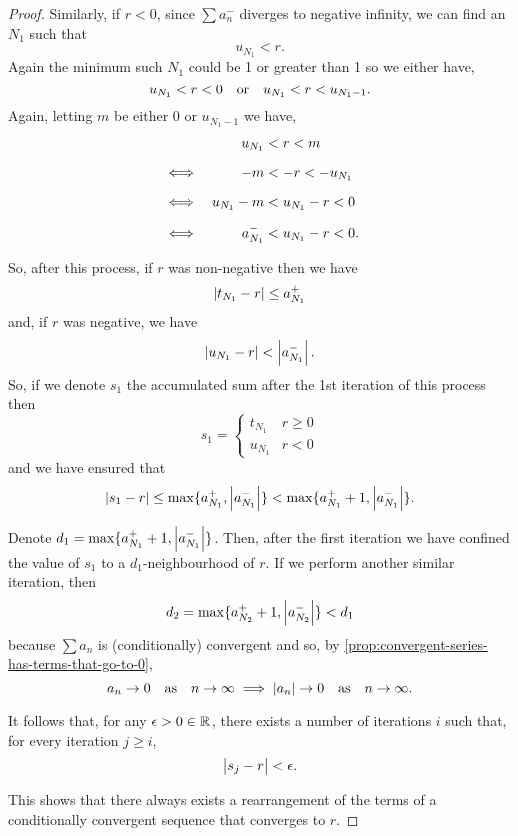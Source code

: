 \documentclass[../MathsNotesBase.tex]{subfiles}
\begin{document}
{\begin{proof}
			Similarly, if ${ r < 0 }$, since ${ \sum a_n^- }$ diverges to negative infinity, we can find an $N_1$ such that
			\[ u_{N_1} < r. \]
			Again the minimum such $N_1$ could be 1 or greater than 1 so we either have,
			\[ u_{N_1} < r < 0 \hspace{10pt}\text{or}\hspace{10pt} u_{N_1} < r < u_{N_1 - 1}. \]
			Again, letting $m$ be either 0 or $u_{N_1 - 1}$ we have,
			\[\begin{aligned}
				&& u_{N_1} &< r < m \nn
				&\iff & -m &< -r < -u_{N_1} \nn
				&\iff & u_{N_1} - m &< u_{N_1} - r < 0 \nn
				&\iff & a_{N_1}^- &< u_{N_1} - r < 0.
			\end{aligned}\]
		
			So, after this process, if $r$ was non-negative then we have
			\[ \left\lvert t_{N_1} - r\right\rvert \leq a_{N_1}^+ \]
			and, if $r$ was negative, we have
			\[ \left\lvert u_{N_1} - r\right\rvert < \left\lvert a_{N_1}^-\right\rvert. \]
			So, if we denote $s_1$ the accumulated sum after the 1st iteration of this process then
			\[ s_1 = 	\begin{cases}
							t_{N_1} & r \geq 0 \\
							u_{N_1} & r < 0
						\end{cases} 
			\]
			and we have ensured that
			\[ \left\lvert s_1 - r\right\rvert \leq \max \{ a_{N_1}^+, \left\lvert a_{N_1}^-\right\rvert \} < \max \{ a_{N_1}^+ + 1, \left\lvert a_{N_1}^-\right\rvert \}. \]
			
			Denote ${ d_1 = \max \{ a_{N_1}^+ + 1, \left\lvert a_{N_1}^-\right\rvert \} }$. Then, after the first iteration we have confined the value of $s_1$ to a $d_1$-neighbourhood of $r$. If we perform another similar iteration, then
			\[ d_2 = \max \{ a_{N_2}^+ + 1, \left\lvert a_{N_2}^-\right\rvert \} < d_1 \]
			because ${ \sum a_n }$ is (conditionally) convergent and so, by \autoref{prop:convergent-series-has-terms-that-go-to-0},
			\[ a_n \to 0 \hspace{10pt}\text{as}\hspace{10pt} n \to \infty \implies \left\lvert a_n\right\rvert \to 0 \hspace{10pt}\text{as}\hspace{10pt} n \to \infty. \]
			
			It follows that, for any ${ \epsilon > 0 \in \mathbb{R}^{} }$, there exists a number of iterations $i$ such that, for every iteration ${ j \geq i }$,
			\[ \left\lvert s_j - r\right\rvert < \epsilon. \]
			
			This shows that there always exists a rearrangement of the terms of a conditionally convergent sequence that converges to $r$.	
		\end{proof}
	
		\nl[12]
		
}
\end{document}
